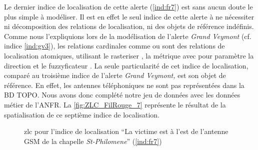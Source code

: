 
Le dernier indice de localisation de cette alerte (\ref{ind:fr7}) est
sans aucun doute le plus simple à modéliser. Il est en effet le seul
indice de cette alerte à ne nécessiter ni décomposition des relations
de localisation, ni des objets de référence indéfinis. Comme nous
l'expliquions lors de la modélisation de l'alerte \emph{Grand Veymont}
(cf. indice \ref{ind:gv3}), les relations cardinales comme
 ou  sont des
relations de localisation atomiques, utilisant le rasteriser
, la métrique \onto[orla]{} avec pour paramètre
la direction et le fuzzyficateur . La seule
particularité de cet indice de localisation, comparé au troisième
indice de l'alerte \emph{Grand Veymont,} est son objet de
référence. En effet, les antennes téléphoniques ne sont pas
représentées dans la BD TOPO. Nous avons donc complété notre jeu de
données avec les données métier de l'ANFR. La
\autoref{fig:ZLC_FilRouge_7} représente le résultat de la
spatialisation de ce septième indice de localisation.

\begin{figure}
  \centering
  
  \caption{\ac{zlc} pour l'indice de localisation \enquote{La victime
      est à l'est de l'antenne GSM de la chapelle \emph{St-Philomene}}
    (\ref{ind:fr7})}
    \label{fig:ZLC_FilRouge_7}
\end{figure}



